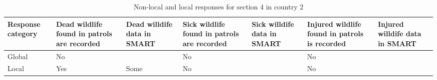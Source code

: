 \documentclass[
  letterpaper,
  DIV=11,
  numbers=noendperiod]{scrartcl}
\begin{document}
\begin{table}[H]

\caption{Non-local and local responses for section 4 in country 2}
\centering
\begin{tabular}[t]{>{\raggedright\arraybackslash}p{2cm}|>{\raggedright\arraybackslash}p{2cm}|>{\raggedright\arraybackslash}p{2cm}|>{\raggedright\arraybackslash}p{2cm}|>{\raggedright\arraybackslash}p{2cm}|>{\raggedright\arraybackslash}p{2cm}|>{\raggedright\arraybackslash}p{2cm}}
\hline
Response
category & Dead wildlife
found in patrols
are recorded & Dead willdife
data in SMART & Sick wildlife
found in patrols
are recorded & Sick willdife
data in SMART & Injured wildlife
found in patrols
is recorded & Injured willdife
data in SMART\\
\hline
Global & No &  & No &  & No & \\
\hline
Local & Yes & Some & No &  & No & \\
\hline
\end{tabular}
\end{table}
\end{document}
